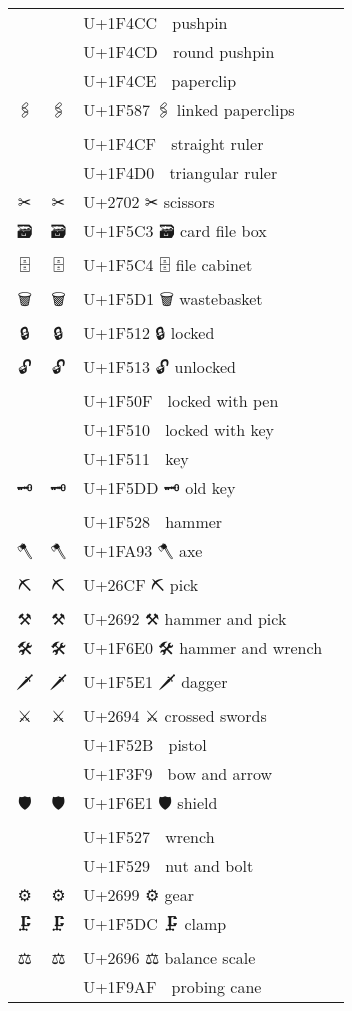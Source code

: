 \documentclass[a4paper,12pt]{ltjarticle}
\newcommand{\fontA}[1]{{\fontspec[RawFeature={mode=harf,+dist,+ccmp}]{Segoe UI Emoji} #1}}
\newcommand{\fontB}[1]{{\fontspec[RawFeature={mode=harf,+dist,+ccmp}]{Noto Color Emoji} #1}}
\begin{document}
\begin{longtable}[c]{ccp{0.8\linewidth}}
\fontA{📌}&\fontB{📌}&U+1F4CC 📌 pushpin\\
\fontA{📍}&\fontB{📍}&U+1F4CD 📍 round pushpin\\
\fontA{📎}&\fontB{📎}&U+1F4CE 📎 paperclip\\
\fontA{🖇}&\fontB{🖇}&U+1F587 🖇 linked paperclips\\
\fontA{📏}&\fontB{📏}&U+1F4CF 📏 straight ruler\\
\fontA{📐}&\fontB{📐}&U+1F4D0 📐 triangular ruler\\
\fontA{✂}&\fontB{✂}&U+2702 ✂ scissors\\
\fontA{🗃}&\fontB{🗃}&U+1F5C3 🗃 card file box\\
\fontA{🗄}&\fontB{🗄}&U+1F5C4 🗄 file cabinet\\
\fontA{🗑}&\fontB{🗑}&U+1F5D1 🗑 wastebasket\\
\fontA{🔒}&\fontB{🔒}&U+1F512 🔒 locked\\
\fontA{🔓}&\fontB{🔓}&U+1F513 🔓 unlocked\\
\fontA{🔏}&\fontB{🔏}&U+1F50F 🔏 locked with pen\\
\fontA{🔐}&\fontB{🔐}&U+1F510 🔐 locked with key\\
\fontA{🔑}&\fontB{🔑}&U+1F511 🔑 key\\
\fontA{🗝}&\fontB{🗝}&U+1F5DD 🗝 old key\\
\fontA{🔨}&\fontB{🔨}&U+1F528 🔨 hammer\\
\fontA{🪓}&\fontB{🪓}&U+1FA93 🪓 axe\\
\fontA{⛏}&\fontB{⛏}&U+26CF ⛏ pick\\
\fontA{⚒}&\fontB{⚒}&U+2692 ⚒ hammer and pick\\
\fontA{🛠}&\fontB{🛠}&U+1F6E0 🛠 hammer and wrench\\
\fontA{🗡}&\fontB{🗡}&U+1F5E1 🗡 dagger\\
\fontA{⚔}&\fontB{⚔}&U+2694 ⚔ crossed swords\\
\fontA{🔫}&\fontB{🔫}&U+1F52B 🔫 pistol\\
\fontA{🏹}&\fontB{🏹}&U+1F3F9 🏹 bow and arrow\\
\fontA{🛡}&\fontB{🛡}&U+1F6E1 🛡 shield\\
\fontA{🔧}&\fontB{🔧}&U+1F527 🔧 wrench\\
\fontA{🔩}&\fontB{🔩}&U+1F529 🔩 nut and bolt\\
\fontA{⚙}&\fontB{⚙}&U+2699 ⚙ gear\\
\fontA{🗜}&\fontB{🗜}&U+1F5DC 🗜 clamp\\
\fontA{⚖}&\fontB{⚖}&U+2696 ⚖ balance scale\\
\fontA{🦯}&\fontB{🦯}&U+1F9AF 🦯 probing cane\\

\end{longtable}
\end{document}
